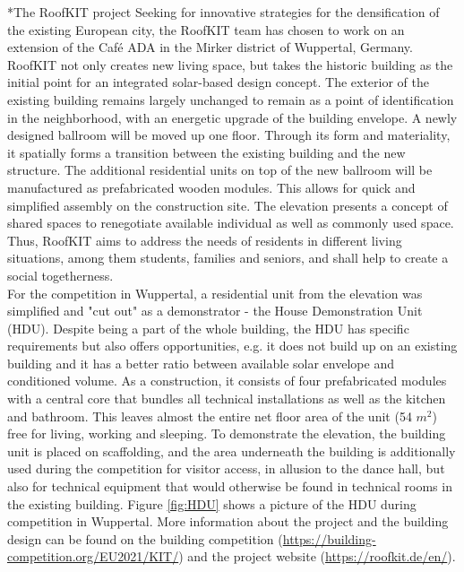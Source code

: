 \documentclass[twocolumn, a4paper,10pt]{article}
\makeatletter
\renewcommand\section{\@startsection{section}{1}{\z@}{3pt}{3pt}{\normalfont\large\bfseries}}
\makeatother
\begin{document}
\section*{The RoofKIT project}
Seeking for innovative strategies for the densification of the existing European city, the RoofKIT team has chosen to work on an extension of the Café ADA in the Mirker district of Wuppertal, Germany. RoofKIT not only creates new living space, but takes the historic building as the initial point for an integrated solar-based design concept. The exterior of the existing building remains largely unchanged to remain as a point of identification in the neighborhood, with an energetic upgrade of the building envelope. A newly designed ballroom will be moved up one floor. Through its form and materiality, it spatially forms a transition between the existing building and the new structure. The additional residential units on top of the new ballroom will be manufactured as prefabricated wooden modules. This allows for quick and simplified assembly on the construction site. The elevation presents a concept of shared spaces to renegotiate available individual as well as commonly used space. Thus, RoofKIT aims to address the needs of residents in different living situations, among them students, families and seniors, and shall help to create a social togetherness.\\
For the competition in Wuppertal, a residential unit from the elevation was simplified and "cut out" as a demonstrator - the House Demonstration Unit (HDU). Despite being a part of the whole building, the HDU has specific requirements but also offers opportunities, e.g. it does not build up on an existing building and it has a better ratio between available solar envelope and conditioned volume. As a construction, it consists of four prefabricated modules with a central core that bundles all technical installations as well as the kitchen and bathroom. This leaves almost the entire net floor area of the unit (54 $m^2$) free for living, working and sleeping. To demonstrate the elevation, the building unit is placed on scaffolding, and the area underneath the building is additionally used during the competition for visitor access, in allusion to the dance hall, but also for technical equipment that would otherwise be found in technical rooms in the existing building. Figure \ref{fig:HDU} shows a picture of the HDU during competition in Wuppertal. More information about the project and the building design can be found on the building competition (\textcolor{blue}{\url{https://building-competition.org/EU2021/KIT/}}) and the project website (\textcolor{blue}{\url{https://roofkit.de/en/}}).
\end{document}
